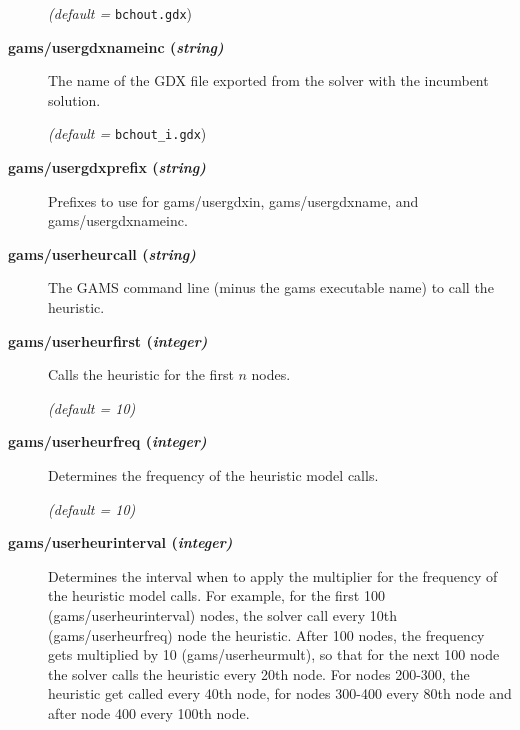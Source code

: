 \begin{description}
\textsl{(default =} \verb=bchout.gdx=)

\item[\label{scipusergdxnameinc}\hypertarget{scipusergdxnameinc}
{\textbf{gams/usergdxnameinc (\slshape{string})}}]\hspace{1.0in}

The name of the GDX file exported from the solver with the incumbent solution.

\textsl{(default =} \verb=bchout_i.gdx=)

\item[\label{scipusergdxprefix}\hypertarget{scipusergdxprefix}
{\textbf{gams/usergdxprefix (\slshape{string})}}]\hspace{1.0in}

Prefixes to use for gams/usergdxin, gams/usergdxname, and gams/usergdxnameinc.


\item[\label{scipuserheurcall}\hypertarget{scipuserheurcall}
{\textbf{gams/userheurcall (\slshape{string})}}]\hspace{1.0in}

The GAMS command line (minus the gams executable name) to call the heuristic.


\item[\label{scipuserheurfirst}\hypertarget{scipuserheurfirst}
{\textbf{gams/userheurfirst (\slshape{integer})}}]\hspace{1.0in}

Calls the heuristic for the first $n$ nodes.

\textsl{(default = 10)}

\item[\label{scipuserheurfreq}\hypertarget{scipuserheurfreq}
{\textbf{gams/userheurfreq (\slshape{integer})}}]\hspace{1.0in}

Determines the frequency of the heuristic model calls.

\textsl{(default = 10)}

\item[\label{scipuserheurinterval}\hypertarget{scipuserheurinterval}
{\textbf{gams/userheurinterval (\slshape{integer})}}]\hspace{1.0in}

Determines the interval when to apply the multiplier for the frequency of the heuristic model calls.
For example, for the first 100 (gams/userheurinterval) nodes, the solver call every 10th (gams/userheurfreq) node the heuristic.
After 100 nodes, the frequency gets multiplied by 10 (gams/userheurmult), so that for the next 100 node the solver calls the heuristic every 20th node.
For nodes 200-300, the heuristic get called every 40th node, for nodes 300-400 every 80th node and after node 400 every 100th node.


\end{description}
